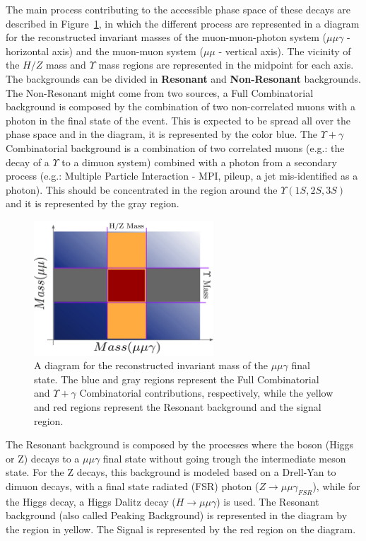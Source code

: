 The main process contributing to the accessible phase space of these decays are described in Figure~\ref{analysis_process_diagram}, in which the different process are represented in a diagram for the reconstructed invariant masses of the muon-muon-photon system ($\mu\mu\gamma$ - horizontal axis) and the muon-muon system ($\mu\mu$ - vertical axis). The vicinity of the $H/Z$ mass and $\Upsilon$ mass regions are represented in the midpoint for each axis. The backgrounds can be divided in \textbf{Resonant} and \textbf{Non-Resonant} backgrounds. The Non-Resonant might come from two sources, a Full Combinatorial background is composed by the combination of two non-correlated muons with a photon in the final state of the event. This is expected to be spread all over the phase space and in the diagram, it is represented by the color blue. The $\Upsilon+ \gamma$ Combinatorial background is a combination of two correlated muons (e.g.: the decay of a $\Upsilon$ to a dimuon system) combined with a photon from a secondary process (e.g.: Multiple Particle Interaction - MPI, pileup, a jet mis-identified as a photon). This should be concentrated in the region around the $\Upsilon(1S, 2S, 3S)$ and it is represented by the gray region.

\begin{figure}[htbp]
    \centering
    \includegraphics[width=0.6\textwidth]{figures_and_tables/analysis_process.pdf}
    \caption{A diagram for the reconstructed invariant mass of the $\mu\mu\gamma$ final state. The blue and gray regions represent the Full Combinatorial and $\Upsilon + \gamma$ Combinatorial contributions, respectively, while the yellow and red regions represent the Resonant background and the signal region.}
    \label{analysis_process_diagram}
\end{figure}

The Resonant background is composed by the processes where the boson (Higgs or Z) decays to a $\mu\mu\gamma$ final state without going trough the intermediate meson state. For the Z decays, this background is modeled based on a Drell-Yan to dimuon decays, with a final state radiated (FSR) photon ($Z \rightarrow \mu\mu\gamma_{FSR}$), while for the Higgs decay, a  Higgs Dalitz decay ($H \rightarrow \mu\mu\gamma$) is used. The Resonant background (also called Peaking Background) is represented in the diagram by the region in yellow. The Signal is represented by the red region on the diagram.

